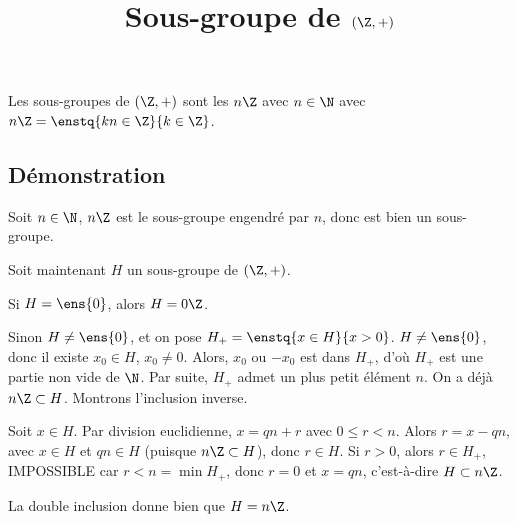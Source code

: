 \documentclass[fontsize=12pt,twoside=false,parskip=half, french]{scrartcl}
\title{Sous-groupe de $(\Z, +)$}
\date{}
\author{}
\begin{document}
\maketitle
   \begin{Theoreme}
      Les sous-groupes de $(\Z, +)$ sont les $n\Z$ avec $n \in \N$ avec $n\Z = \enstq{kn \in \Z}{k \in \Z}$.
   \end{Theoreme}
   \subsection{Démonstration}
      Soit $n \in \N$, $n\Z$ est le sous-groupe engendré par $n$, donc est bien un sous-groupe.

      Soit maintenant $H$ un sous-groupe de $(\Z, +)$.
      
      Si $H = \ens{0}$, alors $H = 0\Z$.

      Sinon $H \neq \ens{0}$, et on pose $H_+ = \enstq{x \in H}{x > 0}$. 
      $H \neq \ens{0}$, donc il existe $x_0 \in H$, $x_0 \neq 0$. Alors, $x_0$ 
      ou $-x_0$ est dans $H_+$, d’où $H_+$ est une partie non vide de $\N$. Par 
      suite, $H_+$ admet un plus petit élément $n$. On a déjà $n\Z \subset H$. 
      Montrons l’inclusion inverse.
      
      Soit $x \in H$. Par division euclidienne, $x = qn + r$ avec $0 \leq r < n$.
      Alors $r = x - qn$, avec $x \in H$ et $qn \in H$ (puisque $n\Z \subset H$),
      donc $r \in H$. Si $r > 0$, alors $r \in H_+$, IMPOSSIBLE car $r < n = \min H_+$,
      donc $r = 0$ et $x = qn$, c’est-à-dire $H \subset n\Z$.
      
      La double inclusion donne bien que $H = n\Z$.
\end{document}
